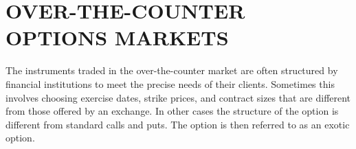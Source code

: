\documentclass{article}
\begin{document}
\section{OVER-THE-COUNTER OPTIONS MARKETS}
The instruments traded in the over-the-counter market are often structured by financial institutions to meet the precise needs of their clients. Sometimes this involves choosing exercise dates, strike prices, and contract sizes that are different from those offered by an exchange. In other cases the structure of the option is different from standard calls and puts. The option is then referred to as an exotic option.
\end{document}
